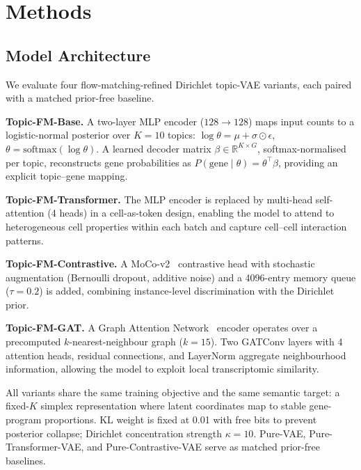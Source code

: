 \documentclass[biology,article,submit,pdftex,moreauthors]{Definitions/mdpi}
\begin{document}
\section{Methods}\label{sec:methods}

\subsection{Model Architecture}
We evaluate four flow-matching-refined Dirichlet topic-VAE variants, each paired with a matched prior-free baseline.

\textbf{Topic-FM-Base.} A two-layer MLP encoder ($128 \to 128$) maps input counts to a logistic-normal posterior over $K{=}10$ topics: $\log\theta = \mu + \sigma \odot \epsilon$, $\theta = \text{softmax}(\log\theta)$. A learned decoder matrix $\beta \in \mathbb{R}^{K \times G}$, softmax-normalised per topic, reconstructs gene probabilities as $P(\text{gene} \mid \theta) = \theta^\top \beta$, providing an explicit topic--gene mapping.

\textbf{Topic-FM-Transformer.} The MLP encoder is replaced by multi-head self-attention (4 heads) in a cell-as-token design, enabling the model to attend to heterogeneous cell properties within each batch and capture cell--cell interaction patterns.

\textbf{Topic-FM-Contrastive.} A MoCo-v2~\cite{chen2020improved} contrastive head with stochastic augmentation (Bernoulli dropout, additive noise) and a 4096-entry memory queue ($\tau{=}0.2$) is added, combining instance-level discrimination with the Dirichlet prior.

\textbf{Topic-FM-GAT.} A Graph Attention Network~\cite{velickovic2018graph} encoder operates over a precomputed $k$-nearest-neighbour graph ($k{=}15$). Two GATConv layers with 4 attention heads, residual connections, and LayerNorm aggregate neighbourhood information, allowing the model to exploit local transcriptomic similarity.

All variants share the same training objective and the same semantic target: a fixed-$K$ simplex representation where latent coordinates map to stable gene-program proportions. KL weight is fixed at 0.01 with free bits to prevent posterior collapse; Dirichlet concentration strength $\kappa{=}10$. Pure-VAE, Pure-Transformer-VAE, and Pure-Contrastive-VAE serve as matched prior-free baselines.
\end{document}

